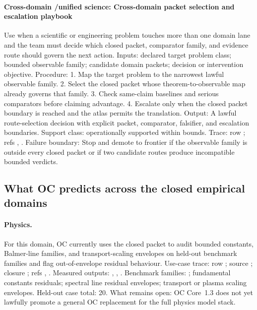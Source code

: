 \paragraph{Cross-domain /\allowbreak unified science: Cross-domain packet selection and escalation playbook}
Use when a scientific or engineering problem touches more than one domain lane and the team must decide which closed packet, comparator family, and evidence route should govern the next action.
Inputs: declared target problem class; \allowbreak bounded observable family; \allowbreak candidate domain packets; \allowbreak decision or intervention objective.
Procedure: 1. Map the target problem to the narrowest lawful observable family. 2. Select the closed packet whose theorem-to-observable map already governs that family. 3. Check same-claim baselines and serious comparators before claiming advantage. 4. Escalate only when the closed packet boundary is reached and the atlas permits the translation.
Output: A lawful route-selection decision with explicit packet, comparator, falsifier, and escalation boundaries.
Support class: operationally supported within bounds.
Trace: row ; \allowbreak refs , \allowbreak {}.
Failure boundary: Stop and demote to frontier if the observable family is outside every closed packet or if two candidate routes produce incompatible bounded verdicts.

\subsection{What OC predicts across the closed empirical domains}

\paragraph{Physics.}
For this domain, OC currently uses the closed packet to audit bounded constants, Balmer-line families, and transport-scaling envelopes on held-out benchmark families and flag out-of-envelope residual behaviour.
Use-case trace: row ; \allowbreak source ; \allowbreak closure ; \allowbreak refs , \allowbreak {}.
Measured outputs: , , .
Benchmark families: ; fundamental constants residuals; spectral line residual envelopes; transport or plasma scaling envelopes.
Held-out case total: 20.
What remains open: OC Core~1.3 does not yet lawfully promote a general OC replacement for the full physics model stack.

